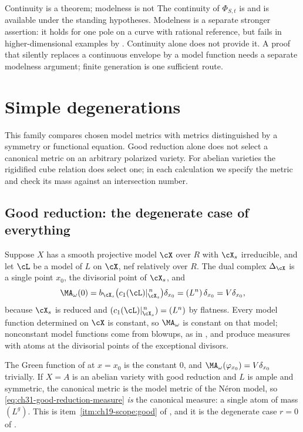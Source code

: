\begin{warning}{Continuity is a theorem; modelness is not}
The continuity of $\Phi_{S,t}$ is
 and is available under the standing
hypotheses.  Modelness is a separate stronger assertion: it holds for one pole on a
curve with rational reference, but fails in higher-dimensional examples
by \cite[Theorem~A]{BJGreen24}.  Continuity alone does not provide it.  A proof that silently replaces a
continuous envelope by a model function needs a separate modelness
argument; finite generation is one sufficient route.
\end{warning}

\section{Simple degenerations}
\label{sec:ch31-degenerations}

This family compares chosen model metrics with metrics distinguished
by a symmetry or functional equation.  Good reduction alone does not
select a canonical metric on an arbitrary polarized variety.  For abelian
varieties the rigidified cube relation does select one; in each calculation
we specify the metric and check its mass against an intersection number.

\subsection{Good reduction: the degenerate case of everything}
\label{sec:ch31-good-reduction}

\begin{example}
\label{ex:ch31-good-reduction}
Suppose $X$ has a smooth projective model $\cX$ over $R$ with
$\cX_s$ irreducible, and let $\cL$ be a model of $L$ on $\cX$, nef
relatively over $R$.  The dual complex $\Delta_{\cX}$ is a single point
$x_0$, the divisorial point of $\cX_s$, and
\begin{equation}
\label{eq:ch31-good-reduction-measure}
 \MA_\omega(0)=b_{\cX_s}\bigl(c_1(\cL)|_{\cX_s}^{\,n}\bigr)\delta_{x_0}
 =(L^n)\,\delta_{x_0}=V\delta_{x_0},
\end{equation}
because $\cX_s$ is reduced and $(c_1(\cL)|_{\cX_s}^{\,n})=(L^n)$ by
flatness.  Every model function determined on $\cX$ is constant, so
$\MA_\omega$ is constant on that model; nonconstant model functions come
from blowups, as in , and produce measures with
atoms at the divisorial points of the exceptional divisors.

The Green function of  at $x=x_0$ is the constant
$0$, and $\MA_\omega(\varphi_{x_0})=V\delta_{x_0}$ trivially.  If
$X=A$ is an abelian variety with good reduction and $L$ is ample and
symmetric, the canonical metric is the model metric of the N\'eron model, so
\eqref{eq:ch31-good-reduction-measure} \emph{is} the canonical measure:
a single atom of mass $(L^g)$.  This is
item~\cref{itm:ch19-scope:good} of , and it is the
degenerate case $r=0$ of .
\end{example}

